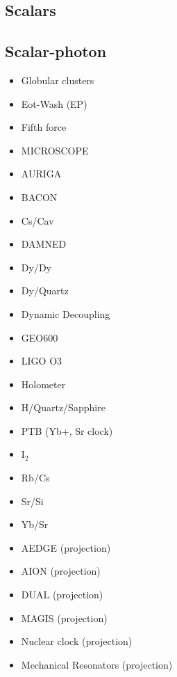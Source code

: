 \documentclass[8pt,twocolumn]{extarticle}
\begin{document}
\begin{mdframed}
\vspace{-1em}
\section{Scalars}\vspace{-0.5em}

\subsection*{Scalar-photon}\vspace{-0.5em}
\begin{itemize}\setlength\itemsep{-0.5em}
	\item Globular clusters~\cite{Dolan:2022kul}
	\item Eot-Wash (EP)~\cite{Hees:2018fpg}
	\item Fifth force~\cite{Adelberger:2003zx,Fischbach:1996eq,Fienga:2023ocw,Mars}
	\item MICROSCOPE~\cite{Berge:2017ovy}
	\item AURIGA~\cite{Branca:2016rez}
	\item BACON~\cite{BACON}
	\item Cs/Cav~\cite{Tretiak:2022ndx}
	\item DAMNED~\cite{Savalle:2020vgz}
	\item Dy/Dy~\cite{VanTilburg:2015oza}
	\item Dy/Quartz~\cite{Zhang:2022ewz}
	\item Dynamic Decoupling~\cite{Aharony:2019iad}
	\item GEO600~\cite{Vermeulen:2021epa}
	\item LIGO O3~\cite{Fukusumi:2023kqd}
	\item Holometer~\cite{Aiello:2021wlp}
	\item H/Quartz/Sapphire~\cite{Campbell:2020fvq}
	\item PTB (Yb+, Sr clock)~\cite{Filzinger:2023zrs}
	\item I$_2$~\cite{Oswald:2021vtc}
	\item Rb/Cs~\cite{Hees:2016gop}
	\item Sr/Si~\cite{Kennedy:2020bac}
	\item Yb/Sr~\cite{Sherrill:2023zah}
	\item AEDGE (projection)~\cite{Badurina:2021rgt}
	\item AION (projection)~\cite{Badurina:2021rgt}
	\item DUAL (projection)~\cite{Arvanitaki:2015iga}
	\item MAGIS (projection)~\cite{MAGIS}
	\item Nuclear clock (projection)~\cite{Antypas:2022asj}
	\item Mechanical Resonators (projection)~\cite{Manley:2019vxy}
\end{itemize}
\vspace{-2em}


\end{mdframed}
\end{document}

